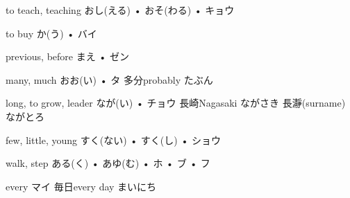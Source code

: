 



\setcounter{cardnum}{137}

		{to teach, teaching}
		{おし(える) • おそ(わる) • キョウ}
		{}{}
		{}{}
		{}{}
		{}{}
		{}{}

		{to buy}
		{か(う) • バイ}
		{}{}
		{}{}
		{}{}
		{}{}
		{}{}

		{previous, before}
		{まえ • ゼン}
		{}{}
		{}{}
		{}{}
		{}{}
		{}{}

		{many, much}
		{おお(い) • タ}
		{多分}{probably たぶん}
		{}{}
		{}{}
		{}{}
		{}{}

		{long, to grow, leader}
		{なが(い) • チョウ}
		{長崎}{Nagasaki ながさき}
		{長瀞}{(surname) ながとろ}
		{}{}
		{}{}
		{}{}

		{few, little, young}
		{すく(ない) • すく(し) • ショウ}
		{}{}
		{}{}
		{}{}
		{}{}
		{}{}

		{walk, step}
		{ある(く) • あゆ(む) • ホ • ブ • フ}
		{}{}
		{}{}
		{}{}
		{}{}
		{}{}

		{every}
		{マイ}
		{毎日}{every day まいにち}
		{}{}
		{}{}
		{}{}
		{}{}

